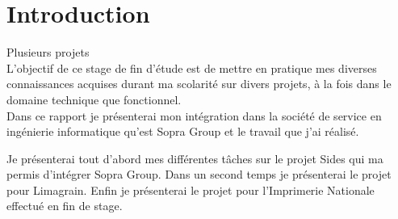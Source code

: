 \cleardoublepage

\chapter*{Introduction}




Plusieurs projets
\\



L'objectif de ce stage de fin d'étude est de mettre en pratique mes diverses connaissances acquises durant ma scolarité sur divers projets, à la fois dans le domaine technique que fonctionnel.
\\


Dans ce rapport je présenterai mon intégration dans la société de service en ingénierie informatique qu'est Sopra Group et le travail que j'ai réalisé.

Je présenterai tout d'abord mes différentes tâches sur le projet Sides qui ma permis d'intégrer Sopra Group.
Dans un second temps je présenterai le projet pour Limagrain.
Enfin je présenterai le projet pour l'Imprimerie Nationale effectué en fin de stage.